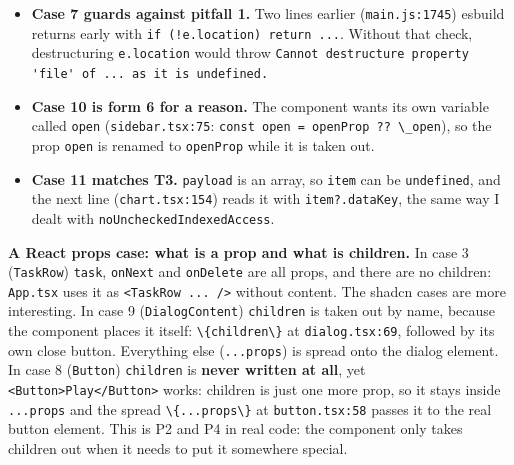 \documentclass[
]{article}
\newcommand{\passthrough}[1]{#1}
\providecommand{\tightlist}{%
  \setlength{\itemsep}{0pt}\setlength{\parskip}{0pt}}
\begin{document}
\begin{itemize}
\tightlist
\item
  \textbf{Case 7 guards against pitfall 1.} Two lines earlier
  (\passthrough{\lstinline!main.js:1745!}) esbuild returns early with
  \passthrough{\lstinline"if (!e.location) return ..."}. Without that
  check, destructuring \passthrough{\lstinline!e.location!} would throw
  \passthrough{\lstinline!Cannot destructure property 'file' of ... as it is undefined.!}
\item
  \textbf{Case 10 is form 6 for a reason.} The component wants its own
  variable called \passthrough{\lstinline!open!}
  (\passthrough{\lstinline!sidebar.tsx:75!}:
  \passthrough{\lstinline!const open = openProp ?? \_open!}), so the
  prop \passthrough{\lstinline!open!} is renamed to
  \passthrough{\lstinline!openProp!} while it is taken out.
\item
  \textbf{Case 11 matches T3.} \passthrough{\lstinline!payload!} is an
  array, so \passthrough{\lstinline!item!} can be
  \passthrough{\lstinline!undefined!}, and the next line
  (\passthrough{\lstinline!chart.tsx:154!}) reads it with
  \passthrough{\lstinline!item?.dataKey!}, the same way I dealt with
  \passthrough{\lstinline!noUncheckedIndexedAccess!}.
\end{itemize}

\textbf{A React props case: what is a prop and what is children.} In
case 3 (\passthrough{\lstinline!TaskRow!})
\passthrough{\lstinline!task!}, \passthrough{\lstinline!onNext!} and
\passthrough{\lstinline!onDelete!} are all props, and there are no
children: \passthrough{\lstinline!App.tsx!} uses it as
\passthrough{\lstinline!<TaskRow ... />!} without content. The shadcn
cases are more interesting. In case 9
(\passthrough{\lstinline!DialogContent!})
\passthrough{\lstinline!children!} is taken out by name, because the
component places it itself: \passthrough{\lstinline!\{children\}!} at
\passthrough{\lstinline!dialog.tsx:69!}, followed by its own close
button. Everything else (\passthrough{\lstinline!...props!}) is spread
onto the dialog element. In case 8 (\passthrough{\lstinline!Button!})
\passthrough{\lstinline!children!} is \textbf{never written at all}, yet
\passthrough{\lstinline!<Button>Play</Button>!} works: children is just
one more prop, so it stays inside \passthrough{\lstinline!...props!} and
the spread \passthrough{\lstinline!\{...props\}!} at
\passthrough{\lstinline!button.tsx:58!} passes it to the real button
element. This is P2 and P4 in real code: the component only takes
children out when it needs to put it somewhere special.
\end{document}
